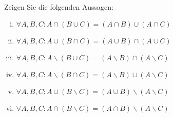 \newcommand{\printpraesenzlsg}{false}
\newcommand{\printloesungen}{true}
\newcommand{\printbewertungen}{false}
\newcommand{\blattnummer}{3}



\iforiginal{}

	

\\
Zeigen Sie die folgenden Aussagen:
\begin{enumerate}[(i)]
    \item $\forall A,B,C: A\cap (B\cup C)=(A\cap B)\cup(A\cap C)$
    \item $\forall A,B,C: A\cup (B\cap C)=(A\cup B)\cap(A\cup C)$
    \item $\forall A,B,C: A\backslash (B\cup C)=(A\backslash B)\cap(A\backslash C)$
    \item $\forall A,B,C: A\backslash (B\cap C)=(A\backslash B)\cup(A\backslash C)$
    \item $\forall A,B,C: A\cup (B\backslash C)=(A\cup B)\backslash(A\backslash C)$
    \item $\forall A,B,C: A\cap (B\backslash C)=(A\cap B)\backslash(A\backslash C)$
\end{enumerate}

